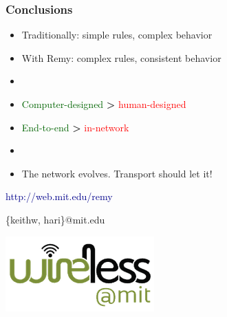 \documentclass[svgnames]{beamer}
\newcommand{\ssline}{\vspace{8 pt}}
\begin{document}
\begin{frame}
\frametitle{Conclusions}

\large

\begin{itemize}

\item Traditionally: simple rules, complex behavior

\item With Remy: complex rules, consistent behavior

\item[]

\item \textcolor{DarkGreen}{Computer-designed} {\LARGE \textbf{\textgreater}} \textcolor{Red}{human-designed}

\item \textcolor{DarkGreen}{End-to-end} {\LARGE \textbf{\textgreater}} \textcolor{Red}{in-network}

\item[]

\item The network evolves. Transport should let it!

\end{itemize}

\ssline
\ssline

\begin{centering}

\textcolor{DarkBlue}{http://web.mit.edu/remy}

\vspace{7 pt}

\{keithw, hari\}@mit.edu

\end{centering}

\begin{raggedleft}
\includegraphics[width=2 cm]{wirelessmitlogo.png}

\end{raggedleft}

\end{frame}
\end{document}
